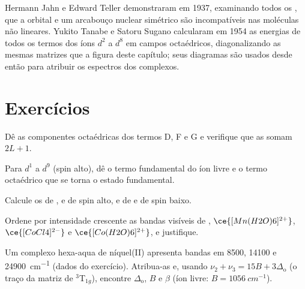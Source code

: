 \begin{history}
Hermann Jahn e Edward Teller demonstraram em 1937, examinando todos os , que a  orbital e um arcabouço nuclear simétrico são
incompatíveis nas moléculas não lineares. Yukito Tanabe e Satoru Sugano calcularam em
1954 as energias de todos os termos dos íons $d^2$ a $d^8$ em campos octaédricos,
diagonalizando as mesmas matrizes que a figura deste capítulo; seus diagramas são
usados desde então para atribuir os espectros dos complexos.
\end{history}

\section{Exercícios}

\begin{exercise}[$\star$]\label{exo:b3:complex-spectra-magnetism:1}
Dê as componentes octaédricas dos termos D, F e G e verifique que as
 somam $2L + 1$.
\end{exercise}

\begin{exercise}[$\star$]\label{exo:b3:complex-spectra-magnetism:2}
Para $d^1$ a $d^9$ (spin alto), dê o termo fundamental do íon livre e o termo octaédrico
que se torna o estado fundamental.
\end{exercise}

\begin{exercise}[$\star$]\label{exo:b3:complex-spectra-magnetism:3}
Calcule os  de ,  e  de spin alto, e de
 e  de spin baixo.
\end{exercise}

\begin{exercise}[$\star$]\label{exo:b3:complex-spectra-magnetism:4}
Ordene por intensidade crescente as bandas visíveis de , $\ce{[Mn(H2O)6]^{2+}}$, $\ce{[CoCl4]^{2-}}$ e
$\ce{[Co(H2O)6]^{2+}}$, e justifique.
\end{exercise}

\begin{exercise}[$\star\star$]\label{exo:b3:complex-spectra-magnetism:5}
Um complexo hexa-aqua de níquel(II) apresenta bandas em 8500, 14100 e \qty{24900}{cm^{-1}} (dados
do exercício). Atribua-as e, usando $\nu_2 + \nu_3 = 15B + 3\Delta_{\mathrm o}$ (o traço da matriz de $^3$T$_{1g}$),
encontre $\Delta_{\mathrm o}$, $B$ e $\beta$ (íon livre: $B = \qty{1056}{cm^{-1}}$).
\end{exercise}

